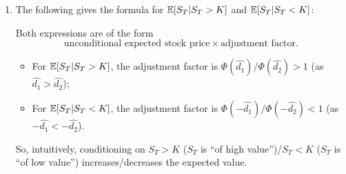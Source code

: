 \begin{enumerate}
\item The following gives the formula for \(\mathbb{E}\qty[S_T|S_T>K]\) and
\(\mathbb{E}\qty[S_T|S_T<K]\):
\begin{intuition}
Both expressions are of the form \[\text{unconditional expected stock
price}\times\text{adjustment factor}.\]
\begin{itemize}
\item For \(\mathbb{E}\qty[S_T|S_T>K]\), the adjustment factor is
\(\Phi(\widehat{d_1})/\Phi(\widehat{d_2})>1\) (as \(\widehat{d_1}>\widehat{d_2}\));
\item For \(\mathbb{E}\qty[S_T|S_T<K]\), the adjustment factor is
\(\Phi(-\widehat{d_1})/\Phi(-\widehat{d_2})<1\) (as \(-\widehat{d_1}< -\widehat{d_2}\)).
\end{itemize}
So, intuitively, conditioning on \(S_T>K\) (\(S_T\) is ``of high
value'')/\(S_T<K\) (\(S_T\) is ``of low value'') increases/decreases the
expected value.
\end{intuition}


\end{enumerate}
